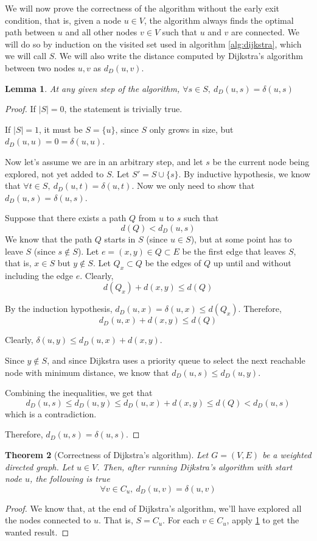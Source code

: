 \documentclass[12pt]{report}
\newtheorem{theorem}{Theorem}[chapter]
\newtheorem{lemma}[theorem]{Lemma}
\begin{document}
We will now prove the correctness of the algorithm without the early exit condition, that is, given a node $u \in V$, the algorithm always finds the optimal path between $u$ and all other nodes $v \in V$ such that $u$ and $v$ are connected. We will do so by induction on the visited set used in algorithm \ref{alg:dijkstra}, which we will call $S$. We will also write the distance computed by Dijkstra's algorithm between two nodes $u, v$ as $d_D(u, v)$.

\begin{lemma}
\label{lemma:dijkstra}
At any given step of the algorithm, $\forall s \in S,\ d_D(u, s) = \delta(u, s)$
\end{lemma}
\begin{proof}
If $|S| = 0$, the statement is trivially true.

If $|S| = 1$, it must be $S = \{u\}$, since $S$ only grows in size, but $d_D(u, u) = 0 = \delta(u, u)$.

Now let's assume we are in an arbitrary step, and let $s$ be the current node being explored, not yet added to $S$. Let $S' = S \cup \{s\}$. By inductive hypothesis, we know that $\forall t \in S,\ d_D(u, t) = \delta(u, t)$. Now we only need to show that $d_D(u, s) = \delta(u, s)$.

Suppose that there exists a path $Q$ from $u$ to $s$ such that
\[d(Q) < d_D(u, s)\]
We know that the path $Q$ starts in $S$ (since $u \in S$), but at some point has to leave $S$ (since $s \not\in S$). Let $e = (x, y) \in Q \subset E$ be the first edge that leaves $S$, that is, $x \in S$ but $y \not\in S$. Let $Q_x \subset Q$ be the edges of $Q$ up until and without including the edge $e$. Clearly,
\[d(Q_x) + d(x, y) \le d(Q)\]

By the induction hypothesis, $d_D(u, x) = \delta(u, x) \le d(Q_x)$. Therefore,
\[ d_D(u, x) + d(x, y) \le d(Q) \]

Clearly, $\delta(u, y) \le d_D(u, x) + d(x, y)$.

Since $y \not\in S$, and since Dijkstra uses a priority queue to select the next reachable node with minimum distance, we know that $d_D(u, s) \le d_D(u, y)$.

Combining the inequalities, we get that
\[ d_D(u, s) \le d_D(u, y) \le d_D(u, x) + d(x, y) \le d(Q) < d_D(u, s) \]
which is a contradiction.

Therefore, $d_D(u, s) = \delta(u, s)$.
\end{proof}

\begin{theorem}[Correctness of Dijkstra's algorithm]
\label{thm:dijkstra}
Let $G = (V, E)$ be a weighted directed graph. Let $u \in V$. Then, after running Dijkstra's algorithm with start node $u$, the following is true
\[ \forall v \in C_u,\  d_D(u, v) = \delta(u, v) \]
\end{theorem}
\begin{proof}
We know that, at the end of Dijkstra's algorithm, we'll have explored all the nodes connected to $u$. That is, $S = C_u$. For each $v \in C_u$, apply \ref{lemma:dijkstra} to get the wanted result.
\end{proof}
\end{document}
